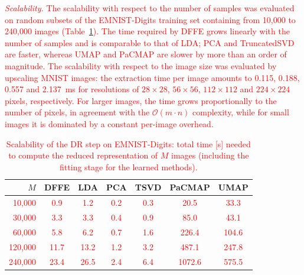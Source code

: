 \documentclass[a4paper,fleqn]{cas-dc}
\begin{document}
\textcolor{red}{\textit{Scalability.} The scalability with respect to the number of samples was evaluated on random subsets of the EMNIST-Digits training set containing from 10{,}000 to 240{,}000 images (Table~\ref{tab:scalability}). The time required by DFFE grows linearly with the number of samples and is comparable to that of LDA; PCA and TruncatedSVD are faster, whereas UMAP and PaCMAP are slower by more than an order of magnitude. The scalability with respect to the image size was evaluated by upscaling MNIST images: the extraction time per image amounts to 0.115, 0.188, 0.557 and 2.137~ms for resolutions of $28\times28$, $56\times56$, $112\times112$ and $224\times224$ pixels, respectively. For larger images, the time grows proportionally to the number of pixels, in agreement with the $\mathcal{O}(m \cdot n)$ complexity, while for small images it is dominated by a constant per-image overhead.}

\begin{table}
    \centering
    \caption{\textcolor{red}{Scalability of the DR step on EMNIST-Digits: total time [s] needed to compute the reduced representation of $M$ images (including the fitting stage for the learned methods).}}
    \label{tab:scalability}
    \begin{tabular}{r|cccccc}
        \hline
        \textbf{$M$} & \textbf{DFFE} & \textbf{LDA} & \textbf{PCA} & \textbf{TSVD} & \textbf{PaCMAP} & \textbf{UMAP} \\
        \hline
        \textcolor{red}{10{,}000}  & \textcolor{red}{0.9}  & \textcolor{red}{1.2}  & \textcolor{red}{0.2} & \textcolor{red}{0.3} & \textcolor{red}{20.5}   & \textcolor{red}{33.3} \\
        \textcolor{red}{30{,}000}  & \textcolor{red}{3.3}  & \textcolor{red}{3.3}  & \textcolor{red}{0.4} & \textcolor{red}{0.9} & \textcolor{red}{85.0}   & \textcolor{red}{43.1} \\
        \textcolor{red}{60{,}000}  & \textcolor{red}{5.8}  & \textcolor{red}{6.2}  & \textcolor{red}{0.7} & \textcolor{red}{1.6} & \textcolor{red}{226.4}  & \textcolor{red}{104.6} \\
        \textcolor{red}{120{,}000} & \textcolor{red}{11.7} & \textcolor{red}{13.2} & \textcolor{red}{1.2} & \textcolor{red}{3.2} & \textcolor{red}{487.1}  & \textcolor{red}{247.8} \\
        \textcolor{red}{240{,}000} & \textcolor{red}{23.4} & \textcolor{red}{26.5} & \textcolor{red}{2.4} & \textcolor{red}{6.4} & \textcolor{red}{1072.6} & \textcolor{red}{575.5} \\
        \hline
    \end{tabular}
\end{table}
\end{document}
